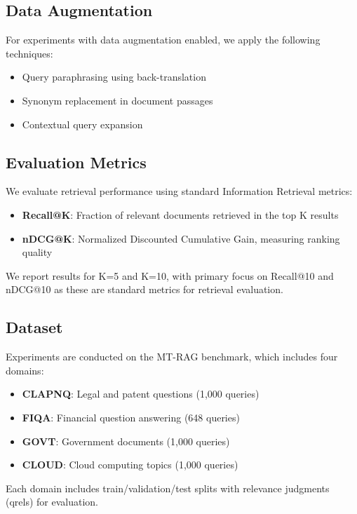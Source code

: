 \documentclass[conference]{IEEEtran}
\begin{document}
\subsection{Data Augmentation}

For experiments with data augmentation enabled, we apply the following techniques:
\begin{itemize}
    \item Query paraphrasing using back-translation
    \item Synonym replacement in document passages
    \item Contextual query expansion
\end{itemize}

\subsection{Evaluation Metrics}

We evaluate retrieval performance using standard Information Retrieval metrics:
\begin{itemize}
    \item \textbf{Recall@K}: Fraction of relevant documents retrieved in the top K results
    \item \textbf{nDCG@K}: Normalized Discounted Cumulative Gain, measuring ranking quality
\end{itemize}

We report results for K=5 and K=10, with primary focus on Recall@10 and nDCG@10 as these are standard metrics for retrieval evaluation.

\subsection{Dataset}

Experiments are conducted on the MT-RAG benchmark, which includes four domains:
\begin{itemize}
    \item \textbf{CLAPNQ}: Legal and patent questions (1,000 queries)
    \item \textbf{FIQA}: Financial question answering (648 queries)
    \item \textbf{GOVT}: Government documents (1,000 queries)
    \item \textbf{CLOUD}: Cloud computing topics (1,000 queries)
\end{itemize}

Each domain includes train/validation/test splits with relevance judgments (qrels) for evaluation.
\end{document}
